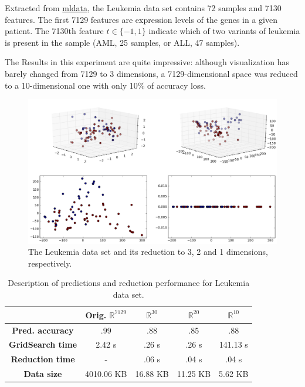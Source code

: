 Extracted from \href{http://mldata.com}{mldata}, the Leukemia data set contains 72 samples and 7130 features. The first 7129 features are expression levels of the genes in a given patient. The 7130th feature $t \in \{-1, 1\}$ indicate which of two variants of leukemia is present in the sample (AML, 25 samples, or ALL, 47 samples). \cite{on:duc_ds}

The Results in this experiment are quite impressive: although visualization has barely changed from 7129 to 3 dimensions, a 7129-dimensional space was reduced to a 10-dimensional one with only 10\% of accuracy loss.

\begin{figure}[H]
	\centering
	\includegraphics[width=.9\linewidth]{img/experiments/iso_leukemia}
	\captionsetup{justification=centering}
	\caption{The Leukemia data set and its reduction to 3, 2 and 1 dimensions, respectively.}
	\label{fig:leukemiads}
\end{figure}

\begin{table}[H]
	\centering
	\begin{tabular}{|c|c|c|c|c|}
		\hline
		& \textbf{Orig. $\mathbb{R}^{7129}$} & \textbf{$\mathbb{R}^{30}$} & \textbf{$\mathbb{R}^{20}$} & \textbf{$\mathbb{R}^{10}$} \\\hline
		\textbf{Pred. accuracy}    & .99 & .88 & .85 & .88 \\\hline
		\textbf{GridSearch time}   & 2.42 s & .26 s & .26 s & 141.13 s \\\hline
		\textbf{Reduction time}    & - & .06 s & .04 s & .04 s \\\hline
		\textbf{Data size}         & 4010.06 KB & 16.88 KB & 11.25 KB & 5.62 KB \\\hline
	\end{tabular}
	\captionsetup{justification=centering}
	\caption{Description of predictions and reduction performance for Leukemia data set.}
\end{table}

